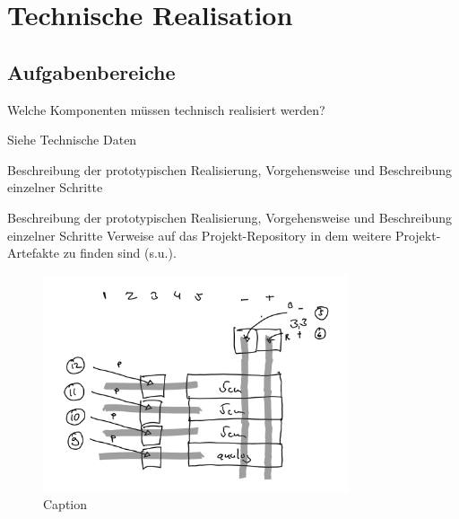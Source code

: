 \chapter{Technische Realisation}

\section{Aufgabenbereiche}

    Welche Komponenten müssen technisch realisiert werden? 


    Siehe Technische Daten

    Beschreibung der prototypischen Realisierung, Vorgehensweise und
    Beschreibung einzelner Schritte


    Beschreibung der prototypischen Realisierung, Vorgehensweise und Beschreibung einzelner Schritte
    Verweise auf das Projekt-Repository in dem weitere Projekt-Artefakte zu finden sind (s.u.).

    \begin{figure}[h]
        \begin{center}
            \includegraphics[width=9cm]{sketches/header_1.png}
        \end{center}
        \caption{Caption}
        \label{fig:header_1}
    \end{figure}

